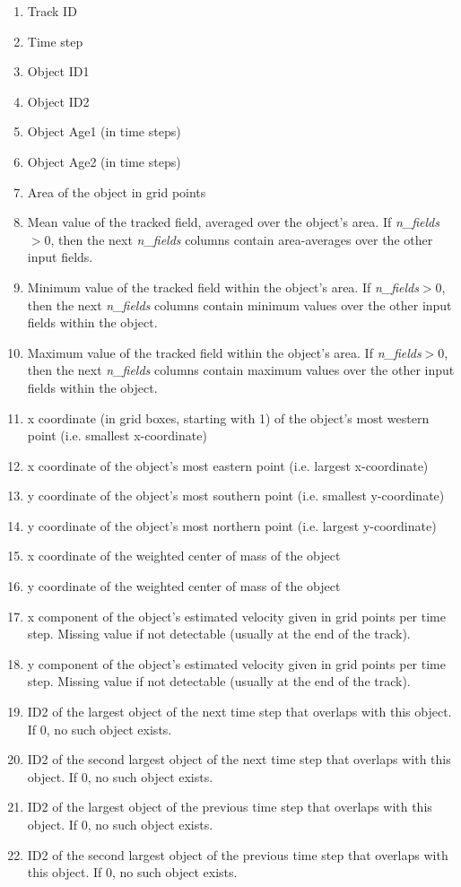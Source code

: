 \documentclass[11pt]{article}
\begin{document}
\begin{enumerate}
\item Track ID
\item Time step
\item Object ID1
\item Object ID2
\item Object Age1 (in time steps)
\item Object Age2 (in time steps)
\item Area of the object in grid points
\item Mean value of the tracked field, averaged over the object's area. If {\it n\_fields}$>0$, then the next {\it n\_fields} columns contain area-averages over the other input fields.
\item Minimum value of the tracked field within the object's area. If {\it n\_fields}$>0$, then the next {\it n\_fields} columns contain minimum values over the other input fields within the object.
\item Maximum value of the tracked field within the object's area. If {\it n\_fields}$>0$, then the next {\it n\_fields} columns contain maximum values over the other input fields within the object.
\item x coordinate (in grid boxes, starting with 1) of the object's most western point (i.e. smallest x-coordinate)
\item x coordinate of the object's most eastern point (i.e. largest x-coordinate)
\item y coordinate of the object's most southern point (i.e. smallest y-coordinate)
\item y coordinate of the object's most northern point (i.e. largest y-coordinate)
\item x coordinate of the weighted center of mass of the object
\item y coordinate of the weighted center of mass of the object
\item x component of the object's estimated velocity given in grid points per time step. Missing value if not detectable (usually at the end of the track).
\item y component of the object's estimated velocity given in grid points per time step. Missing value if not detectable (usually at the end of the track).
\item ID2 of the largest object of the next time step that overlaps with this object. If 0, no such object exists.
\item ID2 of the second largest object of the next time step that overlaps with this object. If 0, no such object exists.
\item ID2 of the largest object of the previous time step that overlaps with this object. If 0, no such object exists.
\item ID2 of the second largest object of the previous time step that overlaps with this object. If 0, no such object exists.
\end{enumerate}\vspace{0.5cm}
\end{document}
